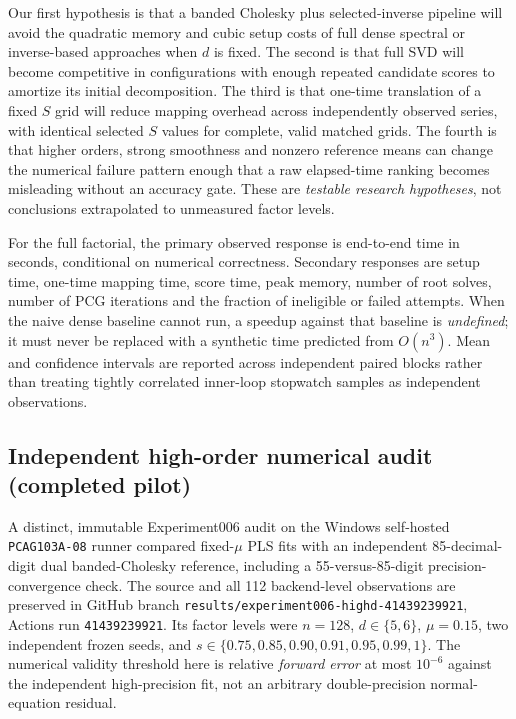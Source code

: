 Our first hypothesis is that a banded Cholesky plus selected-inverse pipeline will avoid the quadratic memory and cubic setup costs of full dense spectral or inverse-based approaches when $d$ is fixed. The second is that full SVD will become competitive in configurations with enough repeated candidate scores to amortize its initial decomposition. The third is that one-time translation of a fixed $S$ grid will reduce mapping overhead across independently observed series, with identical selected $S$ values for complete, valid matched grids. The fourth is that higher orders, strong smoothness and nonzero reference means can change the numerical failure pattern enough that a raw elapsed-time ranking becomes misleading without an accuracy gate. These are \emph{testable research hypotheses}, not conclusions extrapolated to unmeasured factor levels.

For the full factorial, the primary observed response is end-to-end time in seconds, conditional on numerical correctness. Secondary responses are setup time, one-time mapping time, score time, peak memory, number of root solves, number of PCG iterations and the fraction of ineligible or failed attempts. When the naive dense baseline cannot run, a speedup against that baseline is \emph{undefined}; it must never be replaced with a synthetic time predicted from $O(n^3)$. Mean and confidence intervals are reported across independent paired blocks rather than treating tightly correlated inner-loop stopwatch samples as independent observations.


\subsection{Independent high-order numerical audit (completed pilot)}
A distinct, immutable Experiment006 audit on the Windows self-hosted
\texttt{PCAG103A-08} runner compared fixed-$\mu$ PLS fits with an
independent 85-decimal-digit dual banded-Cholesky reference, including
a 55-versus-85-digit precision-convergence check. The source and
all 112 backend-level observations are preserved in GitHub branch
\texttt{results/experiment006-highd-41439239921}, Actions run
\texttt{41439239921}. Its factor levels were $n=128$,
$d\in\{5,6\}$, $\mu=0.15$, two independent frozen seeds, and
$s\in\{0.75,0.85,0.90,0.91,0.95,0.99,1\}$.
The numerical validity threshold here is relative \emph{forward error}
at most $10^{-6}$ against the independent high-precision fit,
not an arbitrary double-precision normal-equation residual.

